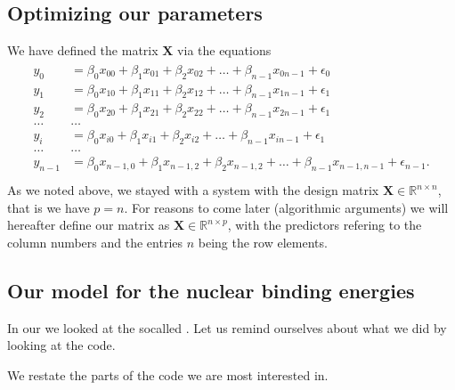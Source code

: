 \documentclass[letterpaper,10pt,english]{sphinxmanual}
\begin{document}
\subsection{Optimizing our parameters}
\label{\detokenize{chapter4:optimizing-our-parameters}}
We have defined the matrix \(\boldsymbol{X}\) via the equations
\begin{equation*}
\begin{split}
\begin{align*}
y_0&=\beta_0x_{00}+\beta_1x_{01}+\beta_2x_{02}+\dots+\beta_{n-1}x_{0n-1}+\epsilon_0\\
y_1&=\beta_0x_{10}+\beta_1x_{11}+\beta_2x_{12}+\dots+\beta_{n-1}x_{1n-1}+\epsilon_1\\
y_2&=\beta_0x_{20}+\beta_1x_{21}+\beta_2x_{22}+\dots+\beta_{n-1}x_{2n-1}+\epsilon_1\\
\dots & \dots \\
y_{i}&=\beta_0x_{i0}+\beta_1x_{i1}+\beta_2x_{i2}+\dots+\beta_{n-1}x_{in-1}+\epsilon_1\\
\dots & \dots \\
y_{n-1}&=\beta_0x_{n-1,0}+\beta_1x_{n-1,2}+\beta_2x_{n-1,2}+\dots+\beta_{n-1}x_{n-1,n-1}+\epsilon_{n-1}.\\
\end{align*}
\end{split}
\end{equation*}
As we noted above, we stayed with a system with the design matrix
\(\boldsymbol{X}\in {\mathbb{R}}^{n\times n}\), that is we have \(p=n\). For reasons to come later (algorithmic arguments) we will hereafter define
our matrix as \(\boldsymbol{X}\in {\mathbb{R}}^{n\times p}\), with the predictors refering to the column numbers and the entries \(n\) being the row elements.


\subsection{Our model for the nuclear binding energies}
\label{\detokenize{chapter4:our-model-for-the-nuclear-binding-energies}}
In our  we looked at the so\sphinxhyphen{}called . Let us remind ourselves about what we did by looking at the code.

We restate the parts of the code we are most interested in.
\end{document}
